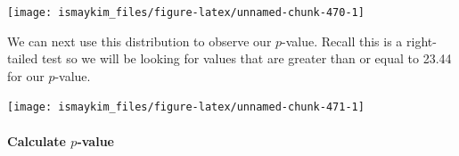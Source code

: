 \documentclass[12pt,]{krantz}
\makeatletter
\newenvironment{Shaded}{\begin{snugshade}}{\end{snugshade}}
\newcommand{\KeywordTok}[1]{\textcolor[rgb]{0.27,0.27,0.27}{\textbf{#1}}}
\newcommand{\DataTypeTok}[1]{\textcolor[rgb]{0.27,0.27,0.27}{#1}}
\newcommand{\DecValTok}[1]{\textcolor[rgb]{0.06,0.06,0.06}{#1}}
\newcommand{\StringTok}[1]{\textcolor[rgb]{0.5,0.5,0.5}{#1}}
\newcommand{\OperatorTok}[1]{\textcolor[rgb]{0.43,0.43,0.43}{\textbf{#1}}}
\newcommand{\NormalTok}[1]{#1}
\let\oldparagraph\paragraph
\renewcommand{\paragraph}[1]{\oldparagraph{#1}\mbox{}}
\newenvironment{kframe}{%
\medskip{}
\setlength{\fboxsep}{.8em}
 \def\at@end@of@kframe{}%
 \ifinner\ifhmode%
  \def\at@end@of@kframe{\end{minipage}}%
  \begin{minipage}{\columnwidth}%
 \fi\fi%
 \def\FrameCommand##1{\hskip\@totalleftmargin \hskip-\fboxsep
 \colorbox{shadecolor}{##1}\hskip-\fboxsep
     \hskip-\linewidth \hskip-\@totalleftmargin \hskip\columnwidth}%
 \MakeFramed {\advance\hsize-\width
   \@totalleftmargin\z@ \linewidth\hsize
   \@setminipage}}%
 {\par\unskip\endMakeFramed%
 \at@end@of@kframe}
\renewenvironment{Shaded}{\begin{kframe}}{\end{kframe}}
\makeatother
\begin{document}
\begin{Shaded}
\end{Shaded}

\begin{Shaded}
\end{Shaded}

\begin{center}\texttt{[image: ismaykim\_files/figure-latex/unnamed-chunk-470-1]} \end{center}

We can next use this distribution to observe our \(p\)-value. Recall
this is a right-tailed test so we will be looking for values that are
greater than or equal to 23.44 for our \(p\)-value.

\begin{Shaded}
\end{Shaded}

\begin{center}\texttt{[image: ismaykim\_files/figure-latex/unnamed-chunk-471-1]} \end{center}

\paragraph{\texorpdfstring{Calculate
\(p\)-value}{Calculate p-value}}\label{calculate-p-value}
\end{document}
